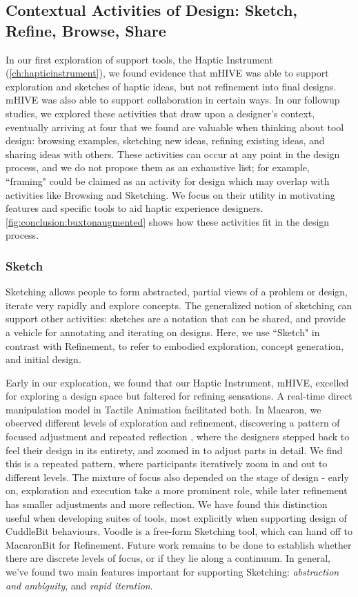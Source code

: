 \subsection{Contextual Activities of Design: Sketch, Refine, Browse, Share}
In our first exploration of \haxd support tools, the Haptic Instrument (\autoref{ch:hapticinstrument}), we found evidence that mHIVE was able to support exploration and sketches of haptic ideas, but not refinement into final designs.
mHIVE was also able to support collaboration in certain ways.
In our followup studies, we explored these activities that draw upon a designer's context, eventually arriving at four that we found are valuable when thinking about tool design: browsing examples, sketching new ideas, refining existing ideas, and sharing ideas with others.
These activities can occur at any point in the design process, and we do not propose them as an exhaustive list; for example, ``framing" \cite{Schon1982,Warr2005} could be claimed as an activity for design which may overlap with activities like Browsing and Sketching.
We focus on their utility in motivating features and specific tools to aid haptic experience designers.
\autoref{fig:conclusion:buxtonaugmented} shows how these activities fit in the design process.




%
%
\subsubsection{Sketch}
Sketching allows people to form abstracted, partial views of a problem or design, iterate very rapidly and explore concepts.
The generalized notion of sketching can support other activities: sketches are a notation that can be shared, and provide a vehicle for annotating and iterating on designs.
Here, we use ``Sketch" in contrast with Refinement, to refer to embodied exploration, concept generation, and initial design.

Early in our exploration, we found that our Haptic Instrument, mHIVE, excelled for exploring a design space but faltered for refining sensations.
A real-time direct manipulation model in Tactile Animation facilitated both.
In Macaron, we observed different levels of exploration and refinement, discovering a pattern of focused adjustment and repeated reflection \cite{Schon1982}, where the designers stepped back to feel their design in its entirety, and zoomed in to adjust parts in detail.
We find this is a repeated pattern, where participants iteratively zoom in and out to different levels.
The mixture of focus also depended on the stage of design - early on, exploration and execution take a more prominent role, while later refinement has smaller adjustments and more reflection.
We have found this distinction useful when developing suites of tools, most explicitly when supporting design of CuddleBit behaviours.
Voodle is a free-form Sketching tool, which can hand off to MacaronBit for Refinement.
Future work remains to be done to establish whether there are discrete levels of focus, or if they lie along a continuum.
In general, we've found two main features important for supporting Sketching: \textit{abstraction and ambiguity}, and \textit{rapid iteration}.



